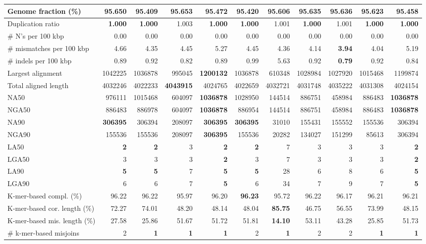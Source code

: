 \documentclass[12pt,a4paper]{article}
\begin{document}
\begin{table}[ht]
\begin{center}
\begin{tabular}{|l*{10}{|r}|}
Genome fraction (\%) & 95.650 & 95.409 & {\bf 95.653} & 95.472 & 95.420 & 95.606 & 95.635 & 95.636 & 95.623 & 95.458 \\ \hline
Duplication ratio & {\bf 1.000} & {\bf 1.000} & 1.003 & {\bf 1.000} & {\bf 1.000} & 1.001 & {\bf 1.000} & 1.001 & {\bf 1.000} & {\bf 1.000} \\ \hline
\# N's per 100 kbp & 0.00 & 0.00 & 0.00 & 0.00 & 0.00 & 0.00 & 0.00 & 0.00 & 0.00 & 0.00 \\ \hline
\# mismatches per 100 kbp & 4.66 & 4.35 & 4.45 & 5.27 & 4.45 & 4.36 & 4.14 & {\bf 3.94} & 4.04 & 5.19 \\ \hline
\# indels per 100 kbp & 0.89 & 0.92 & 0.82 & 0.89 & 0.99 & 5.63 & 0.92 & {\bf 0.79} & 0.92 & 0.84 \\ \hline
Largest alignment & 1042225 & 1036878 & 995045 & {\bf 1200132} & 1036878 & 610348 & 1028984 & 1027920 & 1015468 & 1199874 \\ \hline
Total aligned length & 4032246 & 4022233 & {\bf 4043915} & 4024765 & 4022659 & 4032721 & 4031748 & 4035222 & 4031308 & 4024154 \\ \hline
NA50 & 976111 & 1015468 & 604097 & {\bf 1036878} & 1028950 & 144514 & 886751 & 458984 & 886483 & {\bf 1036878} \\ \hline
NGA50 & 886483 & 886978 & 604097 & {\bf 1036878} & 886954 & 144514 & 886751 & 458984 & 886483 & {\bf 1036878} \\ \hline
NA90 & {\bf 306395} & 306394 & 208097 & {\bf 306395} & {\bf 306395} & 31010 & 155431 & 155552 & 155536 & 306394 \\ \hline
NGA90 & 155536 & 155536 & 208097 & {\bf 306395} & 155536 & 20282 & 134027 & 151299 & 85613 & 306394 \\ \hline
LA50 & {\bf 2} & {\bf 2} & 3 & {\bf 2} & {\bf 2} & 7 & 3 & 3 & 3 & {\bf 2} \\ \hline
LGA50 & 3 & 3 & 3 & {\bf 2} & 3 & 7 & 3 & 3 & 3 & {\bf 2} \\ \hline
LA90 & {\bf 5} & {\bf 5} & 7 & {\bf 5} & {\bf 5} & 28 & 6 & 8 & 6 & {\bf 5} \\ \hline
LGA90 & 6 & 6 & 7 & {\bf 5} & 6 & 34 & 7 & 9 & 7 & {\bf 5} \\ \hline
K-mer-based compl. (\%) & 96.22 & 96.22 & 95.97 & 96.20 & {\bf 96.23} & 95.72 & 96.22 & 96.17 & 96.21 & 96.21 \\ \hline
K-mer-based cor. length (\%) & 72.27 & 74.01 & 48.20 & 48.14 & 48.04 & {\bf 85.75} & 46.75 & 56.55 & 73.99 & 48.15 \\ \hline
K-mer-based mis. length (\%) & 27.58 & 25.86 & 51.67 & 51.72 & 51.81 & {\bf 14.10} & 53.11 & 43.28 & 25.85 & 51.73 \\ \hline
\# k-mer-based misjoins & 2 & {\bf 1} & {\bf 1} & {\bf 1} & 2 & {\bf 1} & 2 & 2 & {\bf 1} & {\bf 1} \\ \hline
\end{tabular}
\end{center}
\end{table}
\end{document}
